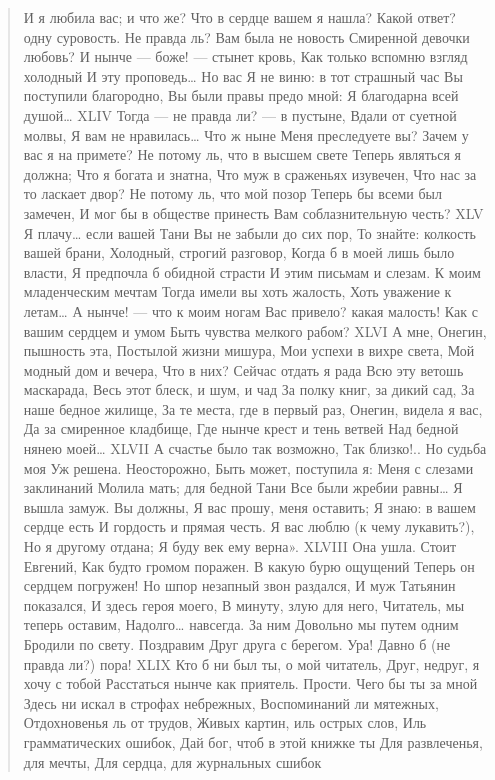 \begin{verse}
И я любила вас; и что же?
Что в сердце вашем я нашла?
Какой ответ? одну суровость.
Не правда ль? Вам была не новость
Смиренной девочки любовь?
И нынче — боже! — стынет кровь,
Как только вспомню взгляд холодный
И эту проповедь… Но вас
Я не виню: в тот страшный час
Вы поступили благородно,
Вы были правы предо мной:
Я благодарна всей душой…
XLIV
Тогда — не правда ли? — в пустыне,
Вдали от суетной молвы,
Я вам не нравилась… Что ж ныне
Меня преследуете вы?
Зачем у вас я на примете?
Не потому ль, что в высшем свете
Теперь являться я должна;
Что я богата и знатна,
Что муж в сраженьях изувечен,
Что нас за то ласкает двор?
Не потому ль, что мой позор
Теперь бы всеми был замечен,
И мог бы в обществе принесть
Вам соблазнительную честь?
XLV
Я плачу… если вашей Тани
Вы не забыли до сих пор,
То знайте: колкость вашей брани,
Холодный, строгий разговор,
Когда б в моей лишь было власти,
Я предпочла б обидной страсти
И этим письмам и слезам.
К моим младенческим мечтам
Тогда имели вы хоть жалость,
Хоть уважение к летам…
А нынче! — что к моим ногам
Вас привело? какая малость!
Как с вашим сердцем и умом
Быть чувства мелкого рабом?
XLVI
А мне, Онегин, пышность эта,
Постылой жизни мишура,
Мои успехи в вихре света,
Мой модный дом и вечера,
Что в них? Сейчас отдать я рада
Всю эту ветошь маскарада,
Весь этот блеск, и шум, и чад
За полку книг, за дикий сад,
За наше бедное жилище,
За те места, где в первый раз,
Онегин, видела я вас,
Да за смиренное кладбище,
Где нынче крест и тень ветвей
Над бедной нянею моей…
XLVII
А счастье было так возможно,
Так близко!.. Но судьба моя
Уж решена. Неосторожно,
Быть может, поступила я:
Меня с слезами заклинаний
Молила мать; для бедной Тани
Все были жребии равны…
Я вышла замуж. Вы должны,
Я вас прошу, меня оставить;
Я знаю: в вашем сердце есть
И гордость и прямая честь.
Я вас люблю (к чему лукавить?),
Но я другому отдана;
Я буду век ему верна».
XLVIII
Она ушла. Стоит Евгений,
Как будто громом поражен.
В какую бурю ощущений
Теперь он сердцем погружен!
Но шпор незапный звон раздался,
И муж Татьянин показался,
И здесь героя моего,
В минуту, злую для него,
Читатель, мы теперь оставим,
Надолго… навсегда. За ним
Довольно мы путем одним
Бродили по свету. Поздравим
Друг друга с берегом. Ура!
Давно б (не правда ли?) пора!
XLIX
Кто б ни был ты, о мой читатель,
Друг, недруг, я хочу с тобой
Расстаться нынче как приятель.
Прости. Чего бы ты за мной
Здесь ни искал в строфах небрежных,
Воспоминаний ли мятежных,
Отдохновенья ль от трудов,
Живых картин, иль острых слов,
Иль грамматических ошибок,
Дай бог, чтоб в этой книжке ты
Для развлеченья, для мечты,
Для сердца, для журнальных сшибок

\end{verse}
